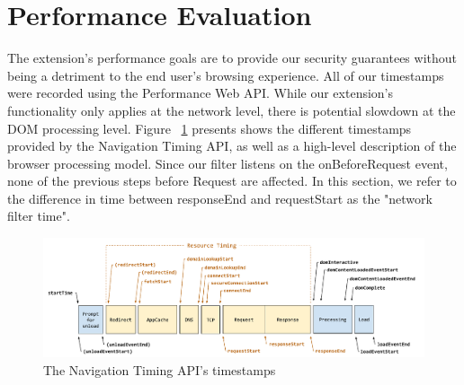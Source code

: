 \section{Performance Evaluation}
The extension's performance goals are to provide our security guarantees without being a detriment to the end user's browsing experience. All of our timestamps were recorded using the Performance Web API. While our extension's functionality only applies at the network level, there is potential slowdown at the DOM processing level. Figure ~\ref{fig:navigationtiming} presents shows the different timestamps provided by the Navigation Timing API, as well as a high-level description of the browser processing model. Since our filter listens on the onBeforeRequest event, none of the previous steps before Request are affected. In this section, we refer to the difference in time between responseEnd and requestStart as the "network filter time".

\begin{figure}[h]
 \includegraphics[scale=0.32]{img/timestamp-diagram}
 \caption{The Navigation Timing API's timestamps}
 \label{fig:navigationtiming}
 \end{figure}

